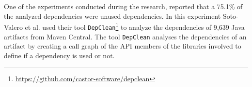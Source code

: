 One of the experiments conducted during the research, reported that a 75.1\% of the analyzed dependencies were unused dependencies. In this experiment Soto-Valero et al. used their tool \texttt{DepClean}\footnote{\href{https://github.com/castor-software/depclean}{https://github.com/castor-software/depclean}} to analyze the dependencies of 9,639 Java artifacts from Maven Central.
The tool \texttt{DepClean} analyses the dependencies of an artifact by creating a call graph of the API members of the libraries involved to define if a dependency is used or not.



